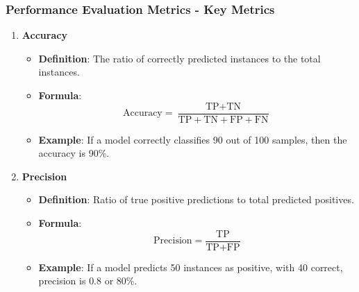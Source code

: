 \documentclass[aspectratio=169]{beamer}
\begin{document}
\begin{frame}[fragile]
    \frametitle{Performance Evaluation Metrics - Key Metrics}
    \begin{enumerate}
        \item \textbf{Accuracy}
            \begin{itemize}
                \item \textbf{Definition}: The ratio of correctly predicted instances to the total instances.
                \item \textbf{Formula}:
                    \[
                    \text{Accuracy} = \frac{\text{TP} + \text{TN}}{\text{TP} + \text{TN} + \text{FP} + \text{FN}}
                    \]
                \item \textbf{Example}: If a model correctly classifies 90 out of 100 samples, then the accuracy is 90\%.
            \end{itemize}
    
        \item \textbf{Precision}
            \begin{itemize}
                \item \textbf{Definition}: Ratio of true positive predictions to total predicted positives.
                \item \textbf{Formula}:
                    \[
                    \text{Precision} = \frac{\text{TP}}{\text{TP} + \text{FP}}
                    \]
                \item \textbf{Example}: If a model predicts 50 instances as positive, with 40 correct, precision is \( 0.8 \) or 80\%.
            \end{itemize}
    \end{enumerate}
\end{frame}
\end{document}

